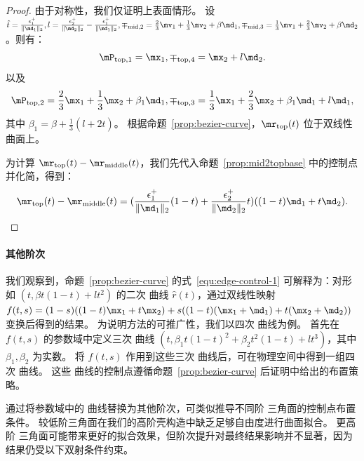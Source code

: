 \begin{proof}
由于对称性，我们仅证明上表面情形。
%
设
$\hat{t}=\frac{\epsilon_1^{+}}{\|\md_1\|_2},l=\frac{\epsilon_2^{+}}{\|\md_2\|_2}-\frac{\epsilon_1^{+}}{\|\md_1\|_2}, \mp_{\text{mid},2}=\frac{2}{3}\mv_1+\frac{1}{3}\mv_2+\beta \md_1,\mp_{\text{mid},3}=\frac{1}{3}\mv_1+\frac{2}{3}\mv_2+\beta \md_2$。则有：
\begin{equation*}
\mP_{\text{top},1}=\mx_1,\mp_{\text{top},4}=\mx_2+l \md_2.
\end{equation*}
以及
\begin{equation*}
\mP_{\text{top},2}=\frac{2}{3}\mx_1+\frac{1}{3}\mx_2+\beta_1 \md_1,\mp_{\text{top},3}=\frac{1}{3}\mx_1+\frac{2}{3}\mx_2+\beta_1 \md_1+l \md_1,
\end{equation*}
其中 $\beta_1=\beta+\frac{1}{3}(l+2 \hat{t})$。
根据命题~\ref{prop:bezier-curve}，$\mr_{\text{top}}(t)$ 位于双线性曲面上。

为计算 $\mr_{\text{top}}(t)-\mr_{\text{middle}}(t)$，我们先代入命题~\ref{prop:mid2topbase} 中的控制点并化简，得到：
$$\mr_\text{top}(t) - \mr_\text{middle}(t) = (\frac{\epsilon_1^{+}}{\|\md_1\|_2}(1-t)+\frac{\epsilon_2^{+}}{\|\md_2\|_2}t)((1-t)\md_1 + t\md_2).$$
\end{proof}

\paragraph{其他阶次}
我们观察到，命题~\ref{prop:bezier-curve} 的式~\eqref{equ:edge-control-1} 可解释为：对形如 $(t,\beta t(1-t)+l t^2)$ 的二次 \Bezier 曲线 $\hat{r}(t)$，通过双线性映射
$f(t,s)=(1-s)((1-t)\mx_1+t\mx_2)+s((1-t)(\mx_1+\md_1)+t(\mx_2+\md_2))$
变换后得到的结果。
为说明方法的可推广性，我们以四次 \Bezier 曲线为例。
首先在 $f(t,s)$ 的参数域中定义三次 \Bezier 曲线
$(t,\beta_1 t(1-t)^2+\beta_2 t^2(1-t)+l t^3)$，其中 $\beta_1,\beta_2$ 为实数。
将 $f(t,s)$ 作用到这些三次 \Bezier 曲线后，可在物理空间中得到一组四次 \Bezier 曲线。
这些 \Bezier 曲线的控制点遵循命题~\ref{prop:bezier-curve} 后证明中给出的布置策略。

通过将参数域中的 \Bezier 曲线替换为其他阶次，可类似推导不同阶 \Bezier 三角面的控制点布置条件。
较低阶三角面在我们的高阶壳构造中缺乏足够自由度进行曲面拟合。
更高阶 \Bezier 三角面可能带来更好的拟合效果，但阶次提升对最终结果影响并不显著，因为结果仍受以下双射条件约束。

